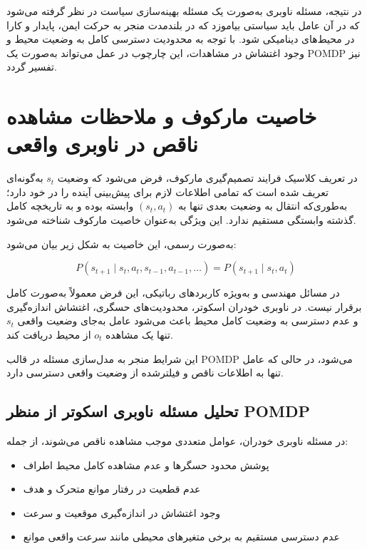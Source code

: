 در نتیجه، مسئله ناوبری به‌صورت یک مسئله بهینه‌سازی سیاست در نظر گرفته می‌شود که در آن عامل باید سیاستی بیاموزد که در بلندمدت منجر به حرکت ایمن، پایدار و کارا در محیط‌های دینامیکی شود. با توجه به محدودیت دسترسی کامل به وضعیت محیط و وجود اغتشاش در مشاهدات، این چارچوب در عمل می‌تواند به‌صورت یک POMDP نیز تفسیر گردد.

\section{خاصیت مارکوف و ملاحظات مشاهده ناقص در ناوبری واقعی}

در تعریف کلاسیک فرایند تصمیم‌گیری مارکوف، فرض می‌شود که وضعیت $s_t$ به‌گونه‌ای تعریف شده است که تمامی اطلاعات لازم برای پیش‌بینی آینده را در خود دارد؛ به‌طوری‌که انتقال به وضعیت بعدی تنها به $(s_t, a_t)$ وابسته بوده و به تاریخچه کامل گذشته وابستگی مستقیم ندارد. این ویژگی به‌عنوان خاصیت مارکوف شناخته می‌شود\cite{SuttonBarto2018}.

به‌صورت رسمی، این خاصیت به شکل زیر بیان می‌شود:

\begin{equation}\label{markov_assumption}
	P(s_{t+1} \mid s_t, a_t, s_{t-1}, a_{t-1}, \dots) 
	=
	P(s_{t+1} \mid s_t, a_t)
\end{equation}

در مسائل مهندسی و به‌ویژه کاربردهای رباتیکی، این فرض معمولاً به‌صورت کامل برقرار نیست. در ناوبری خودران اسکوتر، محدودیت‌های حسگری، اغتشاش اندازه‌گیری و عدم دسترسی به وضعیت کامل محیط باعث می‌شود عامل به‌جای وضعیت واقعی $s_t$ تنها یک مشاهده $o_t$ از محیط دریافت کند.

این شرایط منجر به مدل‌سازی مسئله در قالب POMDP می‌شود، در حالی که عامل تنها به اطلاعات ناقص و فیلترشده از وضعیت واقعی دسترسی دارد.

\subsection*{تحلیل مسئله ناوبری اسکوتر از منظر POMDP}

در مسئله ناوبری خودران، عوامل متعددی موجب مشاهده ناقص می‌شوند، از جمله:

\begin{itemize}
	\item پوشش محدود حسگرها و عدم مشاهده کامل محیط اطراف
	\item عدم قطعیت در رفتار موانع متحرک و هدف
	\item وجود اغتشاش در اندازه‌گیری موقعیت و سرعت
	\item عدم دسترسی مستقیم به برخی متغیرهای محیطی مانند سرعت واقعی موانع
\end{itemize}

